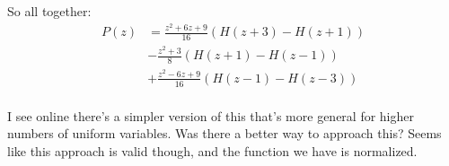 So all together:
\begin{align*}
    P(z) &= \frac{z^2+6z+9}{16}(H(z+3) - H(z+1)) \\
    &- \frac{z^{2}+3}{8} (H(z+1) - H(z-1)) \\
    &+ \frac{z^2 -6z + 9}{16} (H(z-1) - H(z-3)) \\
\end{align*}

I see online there's a simpler version of this that's more general for higher numbers of uniform variables. Was there a better way to approach this? Seems like this approach is valid though, and the function we have is normalized.
